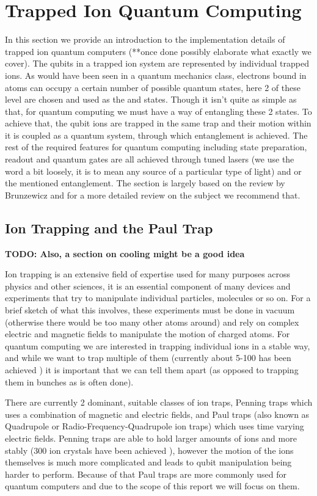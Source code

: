 
\section{Trapped Ion Quantum Computing} \label{sec:Trapped}
In this section we provide an introduction to the implementation details of trapped ion quantum computers (**once done possibly elaborate what exactly we cover).
The qubits in a trapped ion system are represented by individual trapped ions.
As would have been seen in a quantum mechanics class, electrons bound in atoms can occupy a certain number of possible quantum states, here 2 of these level are chosen and used as the \kz and \ko states.
Though it isn't quite as simple as that, for quantum computing we must have a way of entangling these 2 states.
To achieve that, the qubit ions are trapped in the same trap and their motion within it is coupled as a quantum system, through which entanglement is achieved.
The rest of the required features for quantum computing including state preparation, readout and quantum gates are all achieved through tuned lasers (we use the word a bit loosely, it is to mean any source of a particular type of light) and or the mentioned entanglement.
The section is largely based on the review by Brunzewicz \cite{bruzewiczTrappedionQuantumComputing2019} and for a more detailed review on the subject we recommend that.

\subsection{Ion Trapping and the Paul Trap}
\textbf{TODO: Also, a section on cooling might be a good idea}

Ion trapping is an extensive field of expertise used for many purposes across physics and other sciences, it is an essential component of many devices and experiments that try to manipulate individual particles, molecules or so on.
For a brief sketch of what this involves, these experiments must be done in vacuum (otherwise there would be too many other atoms around) and rely on complex electric and magnetic fields to manipulate the motion of charged atoms.
For quantum computing we are interested in trapping individual ions in a stable way, and while we want to trap multiple of them (currently about 5-100 has been achieved \cite{paganoCryogenicTrappedionSystem2018}) it is important that we can tell them apart (as opposed to trapping them in bunches as is often done).

There are currently 2 dominant, suitable classes of ion traps, Penning traps which uses a combination of magnetic and electric fields, and Paul traps (also known as Quadrupole or Radio-Frequency-Quadrupole ion traps) which uses time varying electric fields.
Penning traps are able to hold larger amounts of ions and more stably (300 ion crystals have been achieved \cite{bohnetQuantumSpinDynamics2016}), however the motion of the ions themselves is much more complicated and leads to qubit manipulation being harder to perform.
Because of that Paul traps are more commonly used for quantum computers and due to the scope of this report we will focus on them.

